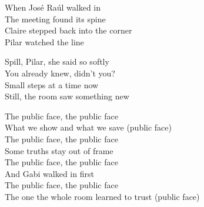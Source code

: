 \begin{lyrics}
When José Raúl walked in\\
The meeting found its spine\\
Claire stepped back into the corner\\
Pilar watched the line

Spill, Pilar, she said so softly\\
You already knew, didn't you?\\
Small steps at a time now\\
Still, the room saw something new

The public face, the public face\\
What we show and what we save (public face)\\
The public face, the public face\\
Some truths stay out of frame\\
The public face, the public face\\
And Gabi walked in first\\
The public face, the public face\\
The one the whole room learned to trust (public face)
\end{lyrics}

